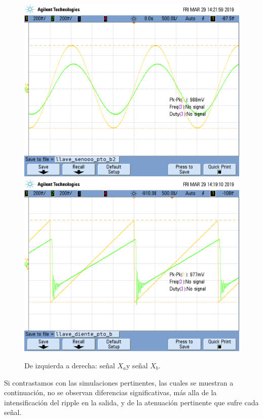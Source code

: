 \documentclass[../../ASSD_TP1_G7.tex]{subfiles}
\begin{document}
\begin{figure}[H]

\centering{}\includegraphics[scale=0.25]{Imagenes/llave_senooo_pto_b2}\includegraphics[scale=0.25]{Imagenes/llave_diente_pto_b}\caption{De izquierda a derecha: señal $X_{a}$y señal $X_{b}$.}
\end{figure}

Si contrastamos con las simulaciones pertinentes, las cuales se muestran
a continuación, no se observan diferencias significativas, más alla
de la intensificación del ripple en la salida, y de la atenuación
pertinente que sufre cada señal.
\end{document}
